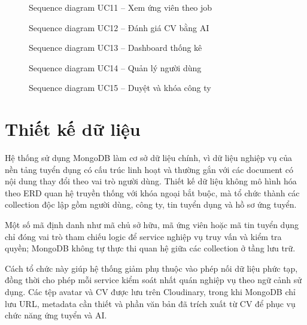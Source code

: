 \documentclass[../DoAn.tex]{subfiles}
\begin{document}
\begin{figure}[H]\centering{}\caption{Sequence diagram UC11 -- Xem ứng viên theo job}\label{fig:seq-uc11}\end{figure}
\begin{figure}[H]\centering{}\caption{Sequence diagram UC12 -- Đánh giá CV bằng AI}\label{fig:seq-uc12}\end{figure}
\begin{figure}[H]\centering{}\caption{Sequence diagram UC13 -- Dashboard thống kê}\label{fig:seq-uc13}\end{figure}
\begin{figure}[H]\centering{}\caption{Sequence diagram UC14 -- Quản lý người dùng}\label{fig:seq-uc14}\end{figure}
\begin{figure}[H]\centering{}\caption{Sequence diagram UC15 -- Duyệt và khóa công ty}\label{fig:seq-uc15}\end{figure}

\section{Thiết kế dữ liệu}
\label{sec:thiet-ke-du-lieu}

Hệ thống sử dụng MongoDB làm cơ sở dữ liệu chính, vì dữ liệu nghiệp vụ của nền tảng tuyển dụng có cấu trúc linh hoạt và thường gắn với các document có nội dung thay đổi theo vai trò người dùng. Thiết kế dữ liệu không mô hình hóa theo ERD quan hệ truyền thống với khóa ngoại bắt buộc, mà tổ chức thành các collection độc lập gồm người dùng, công ty, tin tuyển dụng và hồ sơ ứng tuyển.

Một số mã định danh như mã chủ sở hữu, mã ứng viên hoặc mã tin tuyển dụng chỉ đóng vai trò tham chiếu logic để service nghiệp vụ truy vấn và kiểm tra quyền; MongoDB không tự thực thi quan hệ giữa các collection ở tầng lưu trữ.

Cách tổ chức này giúp hệ thống giảm phụ thuộc vào phép nối dữ liệu phức tạp, đồng thời cho phép mỗi service kiểm soát nhất quán nghiệp vụ theo ngữ cảnh sử dụng. Các tệp avatar và CV được lưu trên Cloudinary, trong khi MongoDB chỉ lưu URL, metadata cần thiết và phần văn bản đã trích xuất từ CV để phục vụ chức năng ứng tuyển và AI.
\end{document}
